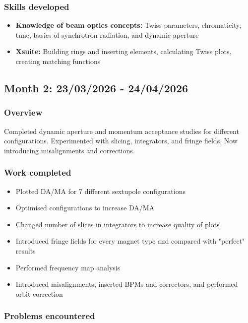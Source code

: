 \documentclass{article}
\begin{document}
\subsubsection{Skills developed}
\begin{itemize}
    \item \textbf{Knowledge of beam optics concepts:} Twiss parameters, chromaticity, tune, basics of synchrotron radiation, and dynamic aperture
    \item \textbf{Xsuite:} Building rings and inserting elements, calculating Twiss plots, creating matching functions
\end{itemize}

\subsection{Month 2: 23/03/2026 - 24/04/2026}
\subsubsection{Overview}

Completed dynamic aperture and momentum acceptance studies for different configurations. Experimented with slicing, integrators, and fringe fields. Now introducing misalignments and corrections.

\subsubsection{Work completed}

\begin{itemize}
\item Plotted DA/MA for 7 different sextupole configurations 
\item Optimised configurations to increase DA/MA
\item Changed number of slices in integrators to increase quality of plots
\item Introduced fringe fields for every magnet type and compared with "perfect" results
\item Performed frequency map analysis
\item Introduced misalignments, inserted BPMs and correctors, and performed orbit correction
\end{itemize}

\subsubsection{Problems encountered}
\end{document}
